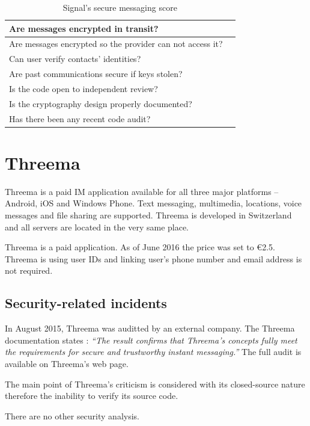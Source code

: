 \documentclass[thesis=M,english]{FITthesis}[2012/10/20]
\newcommand{\cmark}{\ding{51}}%
\begin{document}
\begin{table}[htb]
	\centering
	\caption{Signal's secure messaging score}
	\label{my-label}
	\begin{tabular}{|l|l|}
		\hline
		Are messages encrypted in transit? & \cmark \\\hline
		Are messages encrypted so the provider can not access it? & \cmark \\ \hline
		Can user verify contacts' identities? & \cmark \\ \hline
		Are past communications secure if keys stolen? & \cmark \\ \hline
		Is the code open to independent review? & \cmark \\ \hline
		Is the cryptography design properly documented? & \cmark \\ \hline
		Has there been any recent code audit? & \cmark \\ \hline
	\end{tabular}
\end{table}


\section{Threema}

Threema is a paid IM application available for all three major platforms -- Android, iOS and Windows Phone. Text messaging, multimedia, locations, voice messages and file sharing are supported. Threema is developed in Switzerland and all servers are located in the very same place.

Threema is a paid application. As of June 2016 the price was set to \euro2.5. Threema is using user IDs and linking user's phone number and email address is not required.

\subsection{Security-related incidents}

In August 2015, Threema was auditted by an external company. The Threema documentation states \cite{threema-audit}: \emph{``The result confirms that Threema's concepts fully meet the requirements for secure and trustworthy instant messaging.''} The full audit is available on Threema's web page.

The main point of Threema's criticism is considered with its closed-source nature therefore the inability to verify its source code.

There are no other security analysis.
\end{document}
